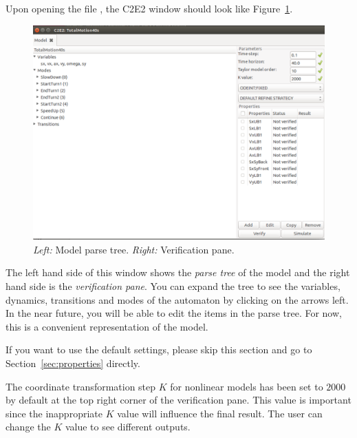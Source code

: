 \documentclass{tufte-book} %
\begin{document}
Upon opening the file , the C2E2 window should look like Figure~\ref{fig:parsetree}.  

\begin{figure}[h!]
\centerline{\includegraphics[scale=.22,keepaspectratio=true]{Images/GUI.jpg}}
\caption{{\em Left:\/} Model parse tree. {\em Right:\/} Verification pane.} 
\label{fig:parsetree}
\end{figure}

The left hand side of this window shows the {\em parse tree \/}of the model
and the right hand side is the {\em verification pane\/}.
You can expand the tree to see the variables, dynamics, transitions and modes of the automaton by clicking on the arrows left.
In the near future, you will be able to edit the items in the parse tree. 
For now, this is a convenient representation of the model. 

If you want to use the default settings, please skip this section and go to Section~\ref{sec:properties} directly.

The coordinate transformation step $K$ for nonlinear models has been set to $2000$ by default at the top right corner of the verification pane. This value is important since the inappropriate $K$ value will influence the final result. The user can change the $K$ value to see different outputs.

~\newline
~\newline
\end{document}
